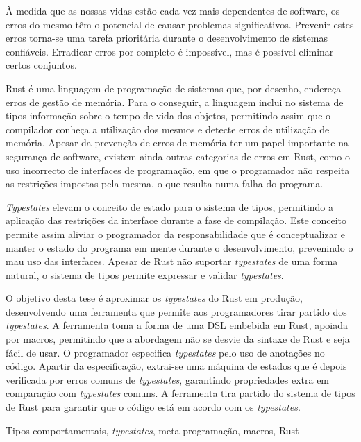 
À medida que as nossas vidas estão cada vez mais dependentes de software,
os erros do mesmo têm o potencial de causar problemas significativos.
Prevenir estes erros torna-se uma tarefa prioritária durante o desenvolvimento de sistemas confiáveis.
Erradicar erros por completo é impossível, mas é possível eliminar certos conjuntos.

Rust é uma linguagem de programação de sistemas que, por desenho, endereça erros de gestão de memória.
Para o conseguir, a linguagem inclui no sistema de tipos informação sobre o tempo de vida dos objetos,
permitindo assim que o compilador conheça a utilização dos mesmos e detecte erros de utilização de memória.
Apesar da prevenção de erros de memória ter um papel importante na segurança de software,
existem ainda outras categorias de erros em Rust,
como o uso incorrecto de interfaces de programação, em que o programador não respeita as restrições impostas pela mesma, o que resulta numa falha do programa.

\emph{Typestates} elevam o conceito de estado para o sistema de tipos,
permitindo a aplicação das restrições da interface durante a fase de compilação.
Este conceito permite assim aliviar o programador da responsabilidade que é conceptualizar e manter o estado do programa em mente durante o desenvolvimento, prevenindo o mau uso das interfaces.
Apesar de Rust não suportar \emph{typestates} de uma forma natural,
o sistema de tipos permite expressar e validar \emph{typestates}.

O objetivo desta tese é aproximar os \emph{typestates} do Rust em produção,
desenvolvendo uma ferramenta que permite aos programadores tirar partido dos \emph{typestates}.
A ferramenta toma a forma de uma DSL embebida em Rust, apoiada por macros,
permitindo que a abordagem não se desvie da sintaxe de Rust e seja fácil de usar.
O programador especifica \emph{typestates} pelo uso de anotações no código.
Apartir da especificação, extrai-se uma máquina de estados que é depois verificada por erros comuns de \emph{typestates},
garantindo propriedades extra em comparação com \emph{typestates} comuns.
A ferramenta tira partido do sistema de tipos de Rust para garantir que o código está em acordo com os \emph{typestates}.

\begin{keywords}
Tipos comportamentais, \emph{typestates}, meta-programação, macros, Rust
\end{keywords}
